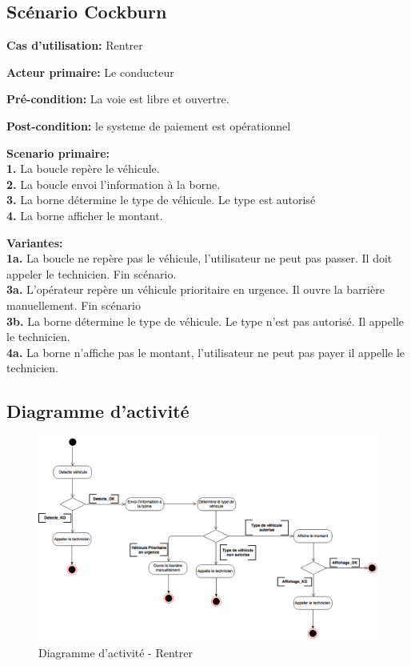 \subsection{Scénario Cockburn}
\textbf{Cas d'utilisation: }Rentrer

\textbf{Acteur primaire:} Le conducteur

\textbf{Pré-condition: } La voie est libre et ouvertre.
 
\textbf{Post-condition: } le systeme de paiement est opérationnel


\textbf{Scenario primaire: } \\
    \textbf{1.} La boucle repère le véhicule.\\
    \textbf{2.} La boucle envoi l’information à la borne.\\
    \textbf{3.} La borne détermine le type de véhicule. Le type est autorisé \\
    \textbf{4.} La borne afficher le montant.

\textbf{Variantes:}\\
    \textbf{1a.} La boucle ne repère pas le véhicule, l’utilisateur ne peut pas passer. Il doit appeler le technicien. Fin scénario.\\
    \textbf{3a.} L’opérateur repère un véhicule prioritaire en urgence. Il ouvre la barrière manuellement. Fin scénario \\
    \textbf{3b.} La borne détermine le type de véhicule. Le type n’est pas autorisé. Il appelle le technicien.\\
    \textbf{4a.} La borne n’affiche pas le montant, l’utilisateur ne peut pas payer il appelle le technicien.\\
\newpage    
\subsection{Diagramme d'activité}
\begin{figure}[!htb]
    \centering
    \includegraphics[scale=0.45, angle = 90]{02_Desenvolvimento/TD2/images/DARentrer.png}
    \caption{Diagramme d'activité - Rentrer}
    \label{fig:DARentrer}
\end{figure}
\newpage    
